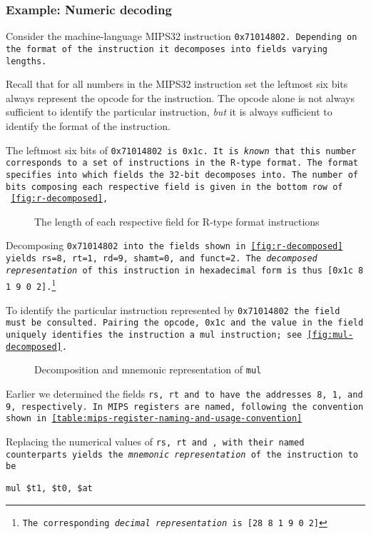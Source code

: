 \subsubsection{Example: Numeric decoding}

Consider the machine-language MIPS32 instruction \tt{0x71014802}.
Depending on the format of the instruction it decomposes into fields
varying lengths.

Recall that for all numbers in the MIPS32 instruction set the leftmost
six bits always represent the opcode for the instruction. The opcode
alone is not always sufficient to identify the particular instruction,
\emph{but} it is always sufficient to identify the format of the
instruction.

The leftmost six bits of \tt{0x71014802} is \tt{0x1c}. It is
\emph{known} that this number corresponds to a set of instructions in
the R-type format. The format specifies into which fields the 32-bit
decomposes into. The number of bits composing each respective field is
given in the bottom row of ~\autoref{fig:r-decomposed},

\begin{figure}[H]
\centering

\caption{The length of each respective field for R-type format instructions}
\label{fig:r-decomposed}
\end{figure}

Decomposing \tt{0x71014802} into the fields shown in
\autoref{fig:r-decomposed} yields \tt{rs=8}, \tt{rt=1}, \tt{rd=9},
\tt{shamt=0}, and \tt{funct=2}. The \emph{decomposed representation}
of this instruction in hexadecimal form is thus \tt{[0x1c 8 1 9 0
  2]}.\footnote{The corresponding \emph{decimal representation} is
  \tt{[28 8 1 9 0 2]}}

To identify the particular instruction represented by \tt{0x71014802}
the \funct{} field must be consulted. Pairing the opcode, \tt{0x1c}
and the value in the \funct{} field uniquely identifies the
instruction a \tt{mul} instruction; see \autoref{fig:mul-decomposed}.

\begin{figure}[H]
  \centering
  
  \caption{Decomposition and mnemonic representation of \tt{mul}}
  \label{fig:mul-decomposed}
\end{figure}

Earlier we determined the fields \tt{rs}, \tt{rt} and \rd{} to have
the addresses 8, 1, and 9, respectively. In MIPS registers are named,
following the convention shown in
\autoref{table:mips-register-naming-and-usage-convention}

Replacing the numerical values of \tt{rs}, \tt{rt} and \rd{}, with
their named counterparts yields the \emph{mnemonic representation} of
the instruction to be

\begin{lstlisting}[style=mips_lst]
mul $t1, $t0, $at
\end{lstlisting}
